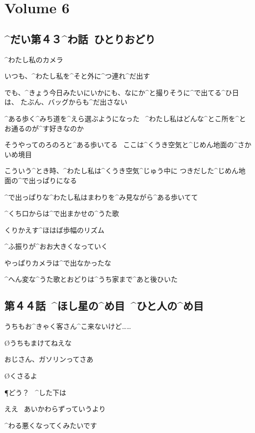 \section{Volume 6}

\subsection{^{だい}{第}４３^{わ}{話}\ ひとりおどり}

\page[2]
\A ^{わたし}{私}のカメラ

\A いつも、^{わたし}{私}を^{そと}{外}に^{つ}{連}れ^{だ}{出}す

\page
\A でも、^{きょう}{今日}みたいにいかにも、なにか^{と}{撮}りそうに^{で}{出}てる^{ひ}{日}は、
たぶん、バッグからも^{だ}{出}さない

\page
\A ^{ある}{歩}く^{みち}{道}を^{えら}{選}ぶようになった
\ ^{わたし}{私}はどんな^{とこ}{所}を^{とお}{通}るのが^{す}{好}きなのか

\A そうやってのろのろと^{ある}{歩}いてる
\ ここは^{くうき}{空気}と^{じめん}{地面}の^{さかいめ}{境目}

\page
\A こういう^{とき}{時}、^{わたし}{私}は^{くうき}{空気}^{じゅう}{中}に
つきだした^{じめん}{地面}の^{で}{出}っぱりになる

\page
\A ^{で}{出}っぱりな^{わたし}{私}はまわりを^{み}{見}ながら^{ある}{歩}いてて

\A ^{くち}{口}からは^{で}{出}まかせの^{うた}{歌}

\A くりかえす^{ほはば}{歩幅}のリズム

\A ^{ふ}{振}りが^{おお}{大}きくなっていく

\page[8]
\A やっぱりカメラは^{で}{出}なかったな

\A ^{へん}{変}な^{うた}{歌}とおどりは^{うち}{家}まで^{あと}{後}ひいた


\subsection{第４４話\ ^{ほし}{星}の^{め}{目}\ ^{ひと}{人}の^{め}{目}}

\page[11]
\A うちもお^{きゃく}{客}さん^{こ}{来}ないけど……

\O うちもまけてねえな

\A おじさん、ガソリンってさあ

\O くさるよ

\page[15]
\P どう？
\ ^{した}{下}は

\page
\AM ええ
\ あいかわらずっていうより

\AM ^{わる}{悪}くなってくみたいです

